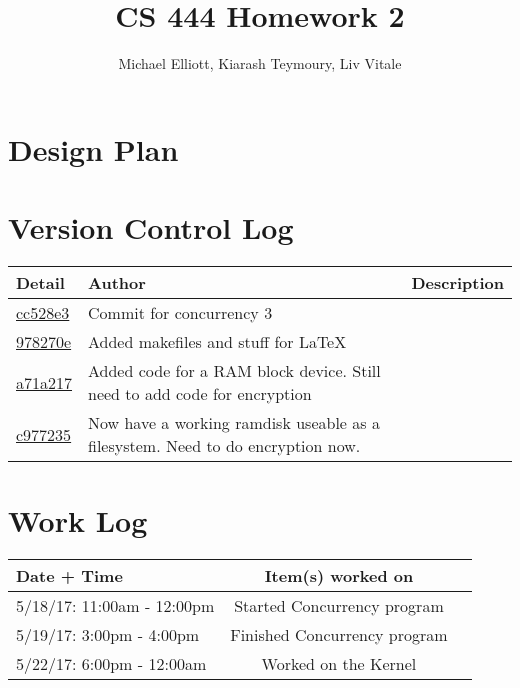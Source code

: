 \documentclass[letterpaper,10pt,titlepage,draftclsnofoot,onecolumn]{IEEEtran}
\title{CS 444 Homework 2}
\author{Michael Elliott, Kiarash Teymoury, Liv Vitale}
\begin{document}
\section{Design Plan}


\section{Version Control Log}

\begin{tabular}{l l l}\textbf{Detail} & \textbf{Author} & \textbf{Description}\\\hline
\href{https://github.com/elliomic/CS-444/commit/cc528e366648a00c65aba64a9f1f2ba0f2559acb}{cc528e3} & Commit for concurrency 3\\\hline
\href{https://github.com/elliomic/CS-444/commit/978270e33710eee398a8e62dc35cba54fb573f49}{978270e} & Added makefiles and stuff for LaTeX\\\hline
\href{https://github.com/elliomic/CS-444/commit/a71a21724fcc71dec65b67e55cf5452a8fbcd1cc}{a71a217} & Added code for a RAM block device. Still need to add code for encryption\\\hline
\href{https://github.com/elliomic/CS-444/commit/c977235b57d99b5232287fd15100ed4ce500282a}{c977235} & Now have a working ramdisk useable as a filesystem. Need to do encryption now.\\\hline
\hline\end{tabular}


\section{Work Log}
\begin{tabular}{l | c | r}
Date + Time & Item(s) worked on \\
\hline
5/18/17: 11:00am - 12:00pm & Started Concurrency program \\
5/19/17: 3:00pm - 4:00pm & Finished Concurrency program \\
5/22/17: 6:00pm - 12:00am & Worked on the Kernel \\
\end{tabular}
\end{document}
